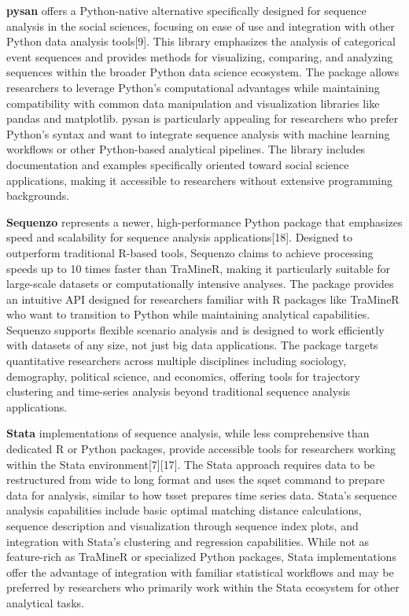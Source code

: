 \documentclass[./main.tex]{subfiles}
\begin{document}
\textbf{pysan} offers a Python-native alternative specifically designed
for sequence analysis in the social sciences, focusing on ease of use
and integration with other Python data analysis tools{[}9{]}. This
library emphasizes the analysis of categorical event sequences and
provides methods for visualizing, comparing, and analyzing sequences
within the broader Python data science ecosystem. The package allows
researchers to leverage Python's computational advantages while
maintaining compatibility with common data manipulation and
visualization libraries like pandas and matplotlib. pysan is
particularly appealing for researchers who prefer Python's syntax and
want to integrate sequence analysis with machine learning workflows or
other Python-based analytical pipelines. The library includes
documentation and examples specifically oriented toward social science
applications, making it accessible to researchers without extensive
programming backgrounds.

\textbf{Sequenzo} represents a newer, high-performance Python package
that emphasizes speed and scalability for sequence analysis
applications{[}18{]}. Designed to outperform traditional R-based tools,
Sequenzo claims to achieve processing speeds up to 10 times faster than
TraMineR, making it particularly suitable for large-scale datasets or
computationally intensive analyses. The package provides an intuitive
API designed for researchers familiar with R packages like TraMineR who
want to transition to Python while maintaining analytical capabilities.
Sequenzo supports flexible scenario analysis and is designed to work
efficiently with datasets of any size, not just big data applications.
The package targets quantitative researchers across multiple disciplines
including sociology, demography, political science, and economics,
offering tools for trajectory clustering and time-series analysis beyond
traditional sequence analysis applications.

\textbf{Stata} implementations of sequence analysis, while less
comprehensive than dedicated R or Python packages, provide accessible
tools for researchers working within the Stata
environment{[}7{]}{[}17{]}. The Stata approach requires data to be
restructured from wide to long format and uses the sqset command to
prepare data for analysis, similar to how tsset prepares time series
data. Stata's sequence analysis capabilities include basic optimal
matching distance calculations, sequence description and visualization
through sequence index plots, and integration with Stata's clustering
and regression capabilities. While not as feature-rich as TraMineR or
specialized Python packages, Stata implementations offer the advantage
of integration with familiar statistical workflows and may be preferred
by researchers who primarily work within the Stata ecosystem for other
analytical tasks.
\end{document}
